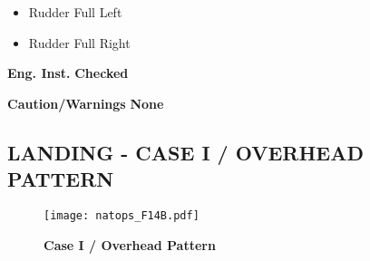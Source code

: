 \documentclass[fontSpartan]{TechCheck}
\begin{document}
\begin{tablenumerate}
{\begin{subenumerate}
\begin{itemize}
				\item Rudder Full Left
				\item Rudder Full Right
			\end{itemize}
			\item \textbf{Eng. Inst.} \dotfill \textbf{Checked}
			\item \textbf{Caution/Warnings}  \dotfill\textbf{None}
		\end{subenumerate}}
	\end{tablenumerate}

	\clearpage

	\subsection{LANDING -  CASE I / OVERHEAD PATTERN}
	\begin{figure}[h]
		\centering
		\texttt{[image: natops\_F14B.pdf]}
		\caption{\textbf{Case I / Overhead Pattern}}
		\label{fig:case1}
	\end{figure}
\end{document}
